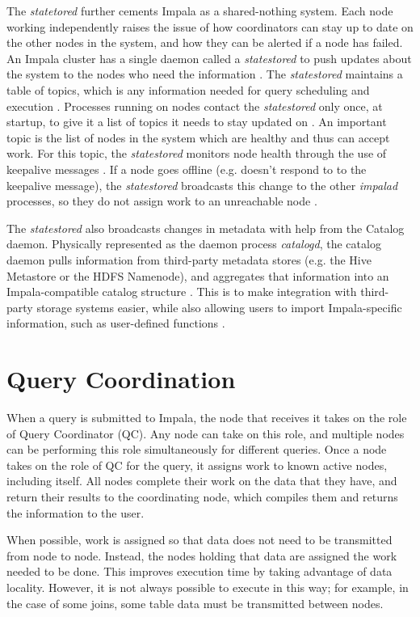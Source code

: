 \documentclass[onecolumn, draftclsnofoot,10pt, compsoc]{IEEEtran}
\begin{document}
The \textit{statetored} further cements Impala as a shared-nothing system.
Each node working independently raises the issue of how coordinators can stay up to date on the other nodes in the system, and how they can be alerted if a node has failed.
An Impala cluster has a single daemon called a \textit{statestored} to push updates about the system to the nodes who need the information \cite{Impala}.
The \textit{statestored} maintains a table of topics, which is any information needed for query scheduling and execution \cite{ImpalaGuide}.
Processes running on nodes contact the \textit{statestored} only once, at startup, to give it a list of topics it needs to stay updated on \cite{Impala}. 
An important topic is the list of nodes in the system which are healthy and thus can accept work. 
For this topic, the \textit{statestored} monitors node health through the use of keepalive messages \cite{Impala}.
If a node goes offline (e.g. doesn’t respond to to the keepalive message), the \textit{statestored} broadcasts this change to the other \textit{impalad} processes, so they do not assign work to an unreachable node \cite{ImpalaGuide}.

The \textit{statestored} also broadcasts changes in metadata with help from the Catalog daemon.
Physically represented as the daemon process \textit{catalogd}, the catalog daemon pulls information from third-party metadata stores (e.g. the Hive Metastore or the HDFS Namenode), and aggregates that information into an Impala-compatible catalog structure \cite{Impala}. 
This is to make integration with third-party storage systems easier, while also allowing users to import Impala-specific information, such as user-defined functions \cite{Impala}.

\section{Query Coordination}
When a query is submitted to Impala, the node that receives it takes on the role of Query Coordinator (QC).
Any node can take on this role, and multiple nodes can be performing this role simultaneously for different queries.
Once a node takes on the role of QC for the query, it assigns work to known active nodes, including itself. 
All nodes complete their work on the data that they have, and return their results to the coordinating node, which compiles them and returns the information to the user. 

When possible, work is assigned so that data does not need to be transmitted from node to node.
Instead, the nodes holding that data are assigned the work needed to be done.
This improves execution time by taking advantage of data locality.
However, it is not always possible to execute in this way; for example, in the case of some joins, some table data must be transmitted between nodes. 
\end{document}
